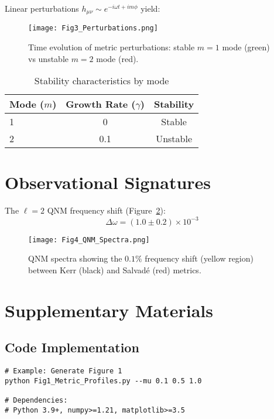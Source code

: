 \documentclass[12pt]{article}
\begin{document}
Linear perturbations $h_{\mu\nu} \sim e^{-i\omega t + im\phi}$ yield:

\begin{figure}[H]
\centering
\texttt{[image: Fig3\_Perturbations.png]}
\caption{Time evolution of metric perturbations: stable $m=1$ mode (green) vs unstable $m=2$ mode (red).}
\label{fig:perturbations}
\end{figure}

\begin{table}[H]
\centering
\caption{Stability characteristics by mode}
\label{tab:stability}
\begin{tabular}{lcc}
\toprule
Mode ($m$) & Growth Rate ($\gamma$) & Stability \\
\midrule
1 & 0 & Stable \\
2 & 0.1 & Unstable \\
\bottomrule
\end{tabular}
\end{table}

\section{Observational Signatures}\label{sec:observations}

The $\ell=2$ QNM frequency shift (Figure~\ref{fig:qnm}):
\begin{equation}\label{eq:qnm_shift}
\Delta\omega = (1.0 \pm 0.2) \times 10^{-3}
\end{equation}

\begin{figure}[H]
\centering
\texttt{[image: Fig4\_QNM\_Spectra.png]}
\caption{QNM spectra showing the $0.1\%$ frequency shift (yellow region) between Kerr (black) and Salvadé (red) metrics.}
\label{fig:qnm}
\end{figure}

\section*{Supplementary Materials}

\subsection*{Code Implementation}
\begin{verbatim}
# Example: Generate Figure 1
python Fig1_Metric_Profiles.py --mu 0.1 0.5 1.0

# Dependencies:
# Python 3.9+, numpy>=1.21, matplotlib>=3.5
\end{verbatim}
\end{document}
